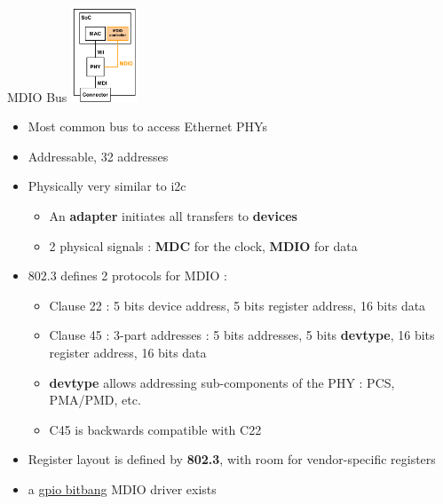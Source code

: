 \begin{frame}{MDIO Bus}
	\hfill
	\includegraphics[width=0.15\textwidth]{slides/networking-driver-phy/mdio.pdf}
	\vspace{-3cm}
	\begin{itemize}
		\item Most common bus to access Ethernet PHYs
		\item Addressable, 32 addresses
		\item Physically very similar to i2c
			\begin{itemize}
				\item An \textbf{adapter} initiates all transfers to \textbf{devices} 
				\item 2 physical signals : \textbf{MDC} for the clock, \textbf{MDIO} for data
			\end{itemize}
		\item 802.3 defines 2 protocols for MDIO :
			\begin{itemize}
				\item Clause 22 : 5 bits device address, 5 bits register address, 16 bits data
				\item Clause 45 : 3-part addresses : 5 bits addresses, 5 bits \textbf{devtype}, 16 bits register address, 16 bits data
				\item \textbf{devtype} allows addressing sub-components of the PHY : PCS, PMA/PMD, etc.
				\item C45 is backwards compatible with C22
			\end{itemize}
		\item Register layout is defined by \textbf{802.3}, with room for vendor-specific registers
		\item a \href{https://elixir.bootlin.com/linux/v6.15.1/source/drivers/net/mdio/mdio-bitbang.c}{gpio bitbang} MDIO driver exists
	\end{itemize}
\end{frame}

